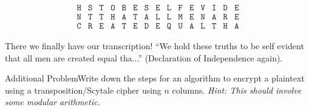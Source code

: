 {\begin{enumerate}
\begin{center}
\[\begin{array}{ccccccccccccccc}
    \texttt{H} & \texttt{S} & \texttt{T} & \texttt{O} & \texttt{B} & \texttt{E} & \texttt{S} & \texttt{E} & \texttt{L} & \texttt{F} & \texttt{E} & \texttt{V} & \texttt{I} & \texttt{D} & \texttt{E} \\
    
    \texttt{N} & \texttt{T} & \texttt{T} & \texttt{H} & \texttt{A} & \texttt{T} & \texttt{A} & \texttt{L} & \texttt{L} & \texttt{M} & \texttt{E} & \texttt{N} & \texttt{A} & \texttt{R} & \texttt{E} \\
    
    \texttt{C} & \texttt{R} & \texttt{E} & \texttt{A} & \texttt{T} & \texttt{E} & \texttt{D} & \texttt{E} & \texttt{Q} & \texttt{U} & \texttt{A} & \texttt{L} & \texttt{T} & \texttt{H} & \texttt{A}
    \end{array}
    \]
    \vspace*{-1cm}
    \end{center}
    There we finally have our transcription! ``We hold these truths to be self evident that all men are created equal tha...'' (Declaration of Independence again).
\end{enumerate}
}

\begin{exercise}
    {Additional Problem}Write down the steps for an algorithm to encrypt a plaintext using a transposition/Scytale cipher using \(n\) columns. \textit{Hint: This should involve some modular arithmetic.} 
\end{exercise}

